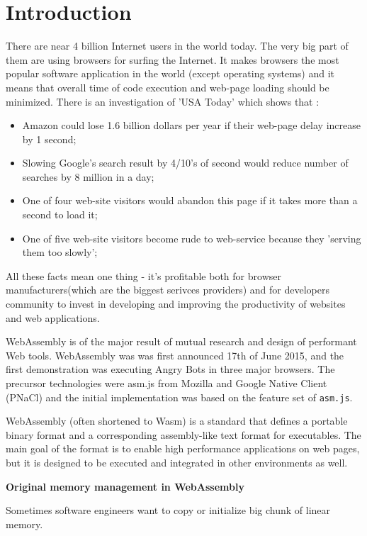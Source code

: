 \chapter*{Introduction}

There are near 4 billion Internet users in the world today. The very big part of them are using browsers for surfing the Internet.
It makes browsers the most popular software application in the world (except operating systems) and it means that overall time of code execution and web-page loading should be minimized. There is an investigation of 'USA Today' which shows that :

\begin{itemize}
 \item Amazon could lose 1.6 billion dollars per year if their web-page delay increase by 1 second;
 \item Slowing Google's search result by 4/10's of second would reduce number of searches by 8 million in a day;
 \item One of four web-site visitors would abandon this page if it takes more than a second to load it;
 \item One of five web-site visitors become rude to web-service because they 'serving them too slowly';
\end{itemize}

All these facts mean one thing - it’s profitable both for browser manufacturers(which are the biggest serivces providers) and for developers community to invest in developing and improving the productivity of websites and web applications.

WebAssembly is of the major result of mutual research and design of performant Web tools. WebAssembly was  was first announced 17th of June 2015, and the first demonstration was executing Angry Bots in three major browsers.
The precursor technologies were asm.js from Mozilla and Google Native Client (PNaCl) and the initial implementation was based on the feature set of \texttt{asm.js}. \cite{Wiki_Wasm}

WebAssembly (often shortened to Wasm) is a standard that defines a portable binary format and a corresponding assembly-like text format for executables. The main goal of the format is to enable high performance applications on web pages, but it is designed to be executed and integrated in other environments as well. \cite{Wiki_Wasm}

\Large \textbf{Original memory management in WebAssembly}

\normalsize Sometimes software engineers want to copy or initialize big chunk of linear memory.


